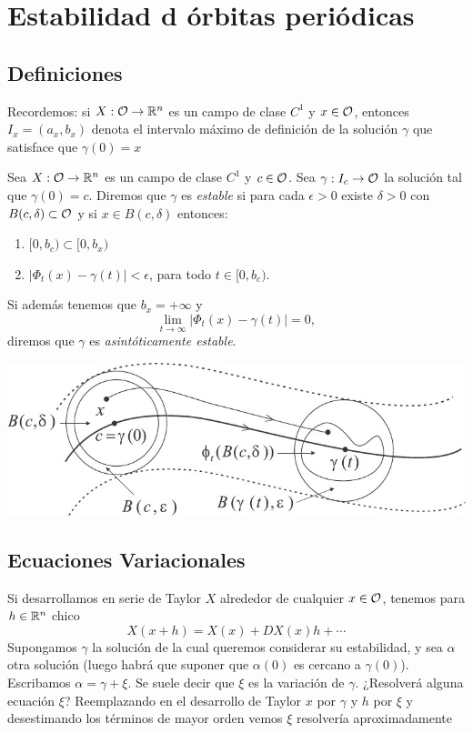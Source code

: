 \section{Estabilidad d órbitas periódicas}

\subsection{Definiciones} 
 Recordemos: si $X:\mathcal{O}\to\mathbb{R}^n$ es un campo de clase $C^1$ y  $x\in\mathcal{O}$, entonces $I_x=(a_x,b_x)$ denota el intervalo máximo
 de definición de la solución $\gamma$ que satisface que $\gamma(0)=x$

 \begin{definicion}
 Sea $X:\mathcal{O}\to\mathbb{R}^n$ es un campo de clase $C^1$ y  $c\in\mathcal{O}$. Sea $\gamma:I_c\to\mathcal{O}$ la solución tal que 
 $\gamma(0)=c$. Diremos que $\gamma$ es \emph{estable} si para cada $\epsilon>0$ existe $\delta>0$ con 
 $B(c,\delta)\subset\mathcal{O}$ y si $x\in B(c,\delta)$ entonces:
 \begin{enumerate}
  \item $[0,b_c)\subset [0,b_x)$
  \item $|\Phi_t(x)-\gamma(t)|<\epsilon$, para todo $t\in[0,b_c)$. 
 \end{enumerate}
  Si además tenemos que $b_x=+\infty$ y
 \[\lim_{t\to\infty}|\Phi_t(x)-\gamma(t)|=0, \]
 diremos que $\gamma$ es \emph{asintóticamente estable}.
\end{definicion}


   \begin{center}
   \includegraphics[scale=0.4]{imagenes/estabilidad_gral.jpg}
   \end{center}




\subsection{Ecuaciones Variacionales}

 Si desarrollamos en serie de Taylor $X$ alrededor de cualquier $x\in\mathcal{O}$, tenemos para $h\in\mathbb{R}^n$ chico
 \[X(x+h)=X(x)+DX(x)h+\cdots\]
Supongamos $\gamma$ la solución de la cual queremos considerar su estabilidad, y sea $\alpha$ otra solución 
(luego habrá que suponer que $\alpha(0)$ es cercano a $\gamma(0)$). Escribamos $\alpha=\gamma+\xi$. Se suele
decir que $\xi$ es la variación de $\gamma$. ¿Resolverá alguna ecuación $\xi$? Reemplazando en el desarrollo de Taylor
$x$ por $\gamma$ y $h$ por $\xi$ y desestimando los términos de mayor orden vemos $\xi$ resolvería aproximadamente


